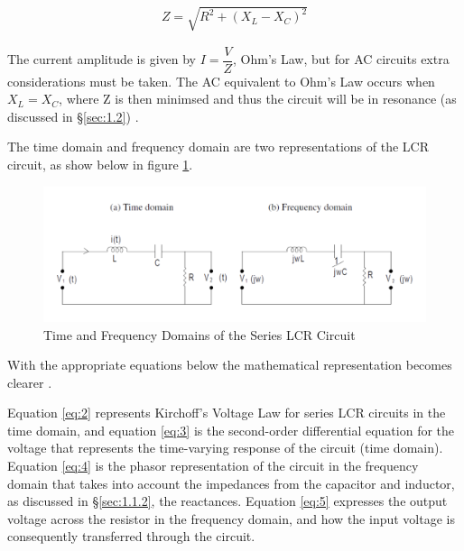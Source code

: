 \documentclass[12pt]{article}
\begin{document}
\begin{gather} \label{eq:1}
    Z = \sqrt{R^2 + (X_L - X_C)^2}
\end{gather}

The current amplitude is given by $I = \dfrac{V}{Z}$, Ohm's Law, but for AC circuits extra considerations must be taken.
The AC equivalent to Ohm's Law occurs when $X_L = X_C$, where Z is then minimsed and thus the circuit will be in resonance (as discussed in §\ref{sec:1.2})
\cite{UCDlcr}.

The time domain and frequency domain are two representations of the LCR circuit, as show below in figure \ref{fig:timefreq}.

\begin{figure} [H]
    \centering
    \includegraphics[width=\textwidth]{time and freq domains.png}
    \caption{\centering \footnotesize{Time and Frequency Domains of the Series LCR Circuit \protect\cite{UCDlcr}}}
    \label{fig:timefreq}
\end{figure}

With the appropriate equations below the mathematical representation becomes clearer
\cite{UCDlcr}.

Equation \ref{eq:2} represents Kirchoff's Voltage Law for series LCR circuits in the time domain, and equation \ref{eq:3} is the second-order differential equation
for the voltage that represents the time-varying response of the circuit (time domain).
Equation \ref{eq:4} is the phasor representation of the circuit in the frequency domain that takes into account the impedances from the capacitor and inductor,
as discussed in §\ref{sec:1.1.2}, the reactances. Equation \ref{eq:5} expresses the output voltage across the resistor in the frequency domain, and how the input voltage is
consequently transferred through the circuit.
\end{document}
